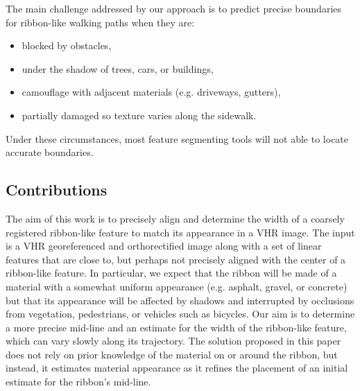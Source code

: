 The main challenge addressed by our approach is to predict precise boundaries for ribbon-like walking paths when they are:
\begin{itemize}
    \item blocked by obstacles,
    \item under the shadow of trees, cars, or buildings,
    \item camouflage with adjacent materials (e.g. driveways, gutters),
    \item partially damaged so texture varies along the sidewalk.
\end{itemize}
Under these circumstances, most feature segmenting tools will not able to locate accurate boundaries. 



\subsection{Contributions}
The aim of this work is to precisely align and determine the width of a coarsely registered ribbon-like feature to match its appearance in a \ac{VHR} image. 
The input is a \ac{VHR} georeferenced and orthorectified image along with a set of linear features that are close to, but perhaps not precisely aligned with the center of a ribbon-like feature. 
In particular, we expect that the ribbon will be made of a material with a somewhat uniform appearance (e.g. asphalt, gravel, or concrete) but that its appearance will be affected by shadows and interrupted by occlusions from vegetation, pedestrians, or vehicles such as bicycles.  
Our aim is to determine a more precise mid-line and an estimate for the width of the ribbon-like feature, which can vary slowly along its trajectory. 
The solution proposed in this paper does not rely on prior knowledge of the material on or around the ribbon, but instead, it estimates material appearance as it refines the placement of an initial estimate for the ribbon's mid-line.
	
